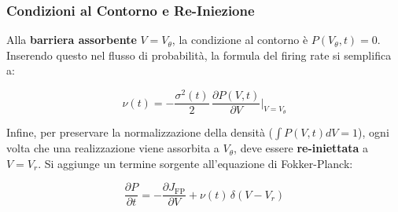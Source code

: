 \subsubsection{Condizioni al Contorno e Re-Iniezione}

Alla \textbf{barriera assorbente} $V = V_\theta$, la condizione al contorno è $P(V_\theta, t) = 0$. Inserendo questo nel flusso di probabilità, la formula del firing rate si semplifica a:

\begin{equation}
\nu(t) = -\frac{\sigma^2(t)}{2}\,\frac{\partial P(V,t)}{\partial V}\bigg|_{V = V_\theta}
\end{equation}

Infine, per preservare la normalizzazione della densità ($\int P(V,t)dV = 1$), ogni volta che una realizzazione viene assorbita a $V_\theta$, deve essere \textbf{re-iniettata} a $V = V_r$. Si aggiunge un termine sorgente all'equazione di Fokker-Planck:

\begin{equation}
\frac{\partial P}{\partial t} = -\frac{\partial J_{\text{FP}}}{\partial V} + \nu(t)\,\delta(V - V_r)
\end{equation}

